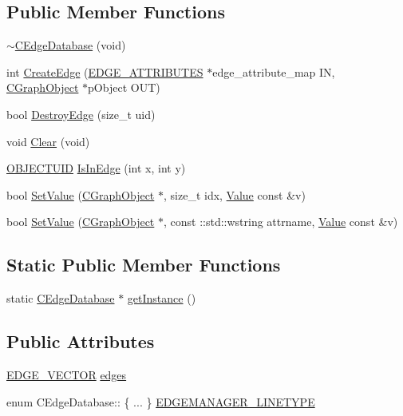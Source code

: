 \subsection*{Public Member Functions}
\begin{DoxyCompactItemize}
\item 
\hyperlink{class_c_edge_database_a4fcc966caac568398ebd877c71a9d90b}{$\sim$\+C\+Edge\+Database} (void)
\item 
int \hyperlink{class_c_edge_database_a4c4fb5636a1075273fef3e6b1b2029fd}{Create\+Edge} (\hyperlink{_object_database_defines_8h_a2ad4882d24b3180a208f8edf95699724}{E\+D\+G\+E\+\_\+\+A\+T\+T\+R\+I\+B\+U\+T\+E\+S} $\ast$edge\+\_\+attribute\+\_\+map I\+N, \hyperlink{class_c_graph_object}{C\+Graph\+Object} $\ast$p\+Object O\+U\+T)
\item 
bool \hyperlink{class_c_edge_database_aeced2ed86e44e317b24b6c71d535c6fc}{Destroy\+Edge} (size\+\_\+t uid)
\item 
void \hyperlink{class_c_edge_database_abc72aaeb130d8f22ed6eadb8e6ee6b4b}{Clear} (void)
\item 
\hyperlink{_object_database_defines_8h_a94737d47c4026f6b51b28dbf4800b2be}{O\+B\+J\+E\+C\+T\+U\+I\+D} \hyperlink{class_c_edge_database_abc2c33e5fac6cd4712e1beb7a59f1ba0}{Is\+In\+Edge} (int x, int y)
\item 
bool \hyperlink{class_c_edge_database_a5e43cf15f3ddbf9ca3327855aaab8d38}{Set\+Value} (\hyperlink{class_c_graph_object}{C\+Graph\+Object} $\ast$, size\+\_\+t idx, \hyperlink{class_value}{Value} const \&v)
\item 
bool \hyperlink{class_c_edge_database_a0ddac66f89b497c36df8472cecdd4e39}{Set\+Value} (\hyperlink{class_c_graph_object}{C\+Graph\+Object} $\ast$, const \+::std\+::wstring attrname, \hyperlink{class_value}{Value} const \&v)
\end{DoxyCompactItemize}
\subsection*{Static Public Member Functions}
\begin{DoxyCompactItemize}
\item 
static \hyperlink{class_c_edge_database}{C\+Edge\+Database} $\ast$ \hyperlink{class_c_edge_database_af5701888a77a7298c912e1f5f8ac72f4}{get\+Instance} ()
\end{DoxyCompactItemize}
\subsection*{Public Attributes}
\begin{DoxyCompactItemize}
\item 
\hyperlink{class_c_edge_database_a08466635640bd52b2f5a31418c7fc9e6}{E\+D\+G\+E\+\_\+\+V\+E\+C\+T\+O\+R} \hyperlink{class_c_edge_database_a2a1689567a1355c92bb6bfd04a97a7d1}{edges}
\item 
enum C\+Edge\+Database\+:: \{ ... \}  \hyperlink{class_c_edge_database_a7eacf69de5cad8d2c2452c6c84c1e22a}{E\+D\+G\+E\+M\+A\+N\+A\+G\+E\+R\+\_\+\+L\+I\+N\+E\+T\+Y\+P\+E}
\end{DoxyCompactItemize}
